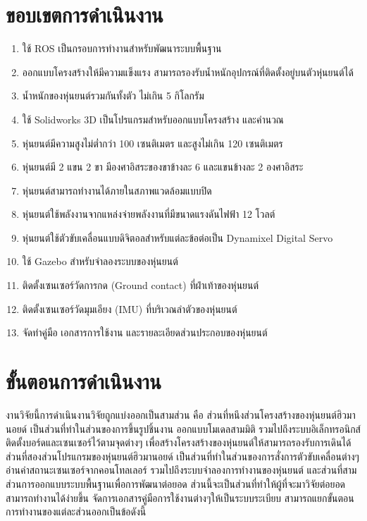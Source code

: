 \section{ขอบเขตการดำเนินงาน}
\begin{enumerate}[label=\thesection.\arabic*, leftmargin=1.5cm]
	\item ใช้ ROS เป็นกรอบการทำงานสำหรับพัฒนาระบบพื้นฐาน
	\item ออกแบบโครงสร้างให้มีความแข็งแรง สามารถรองรับน้ำหนักอุปกรณ์ที่ติดตั้งอยู่บนตัวหุ่นยนต์ได้
	\item น้ำหนักของหุ่นยนต์รวมกันทั้งตัว ไม่เกิน 5 กิโลกรัม
	\item ใช้ Solidworks 3D เป็นโปรแกรมสำหรับออกแบบโครงสร้าง และคำนวณ
	\item หุ่นยนต์มีความสูงไม่ต่ำกว่า 100 เซนติเมตร และสูงไม่เกิน 120 เซนติเมตร
	\item หุ่นยนต์มี 2 แขน 2 ขา มีองศาอิสระของขาข้างละ 6 และแขนข้างละ 2 องศาอิสระ
	\item หุ่นยนต์สามารถทำงานได้ภายในสภาพแวดล้อมแบบปิด
	\item หุ่นยนต์ใช้พลังงานจากแหล่งจ่ายพลังงานที่มีขนาดแรงดันไฟฟ้า 12 โวลต์
	\item หุ่นยนต์ใช้ตัวขับเคลื่อนแบบดิจิตอลสำหรับแต่ละข้อต่อเป็น Dynamixel Digital Servo
	\item ใช้ Gazebo สำหรับจำลองระบบของหุ่นยนต์
	\item ติดตั้งเซนเซอร์วัดการกด (Ground contact) ที่ฝ่าเท้าของหุ่นยนต์
	\item ติดตั้งเซนเซอร์วัดมุมเอียง (IMU) ที่บริเวณลำตัวของหุ่นยนต์
	\item จัดทำคู่มือ เอกสารการใช้งาน และรายละเอียดส่วนประกอบของหุ่นยนต์
\end{enumerate}

\section{ขั้นตอนการดำเนินงาน}
งานวิจัยนี้การดำเนินงานวิจัยถูกแบ่งออกเป็นสามส่วน คือ ส่วนที่หนึงส่วนโครงสร้างของหุ่นยนต์ฮิวมานอยด์ เป็นส่วนที่ทำในส่วนของการขึ้นรูปชิ้นงาน
ออกแบบโมเดลสามมิติ รวมไปถึงระบบอิเล็กทรอนิกส์ ติดตั้งบอร์ดและเซนเซอร์ไว้ตามจุดต่างๆ เพื่อสร้างโครงสร้างของหุ่นยนต์ให้สามารถรองรับการเดินได้
ส่วนที่สองส่วนโปรแกรมของหุ่นยนต์ฮิวมานอยด์ เป็นส่วนที่ทำในส่วนของการสั่งการตัวขับเคลื่อนต่างๆ อ่านค่าสถานะเซนเซอร์จากคอนโทลเลอร์
รวมไปถึงระบบจำลองการทำงานของหุ่นยนต์ และส่วนที่สามส่วนการออกแบบระบบพื้นฐานเพื่อการพัฒนาต่อยอด ส่วนนี้จะเป็นส่วนที่ทำให้ผู้ที่จะมาวิจัยต่อยอดสามารถทำงานได้ง่ายขึ้น
จัดการเอกสารคู่มือการใช้งานต่างๆให้เป็นระบบระเบียบ สามารถแยกขั้นตอนการทำงานของแต่ละส่วนออกเป็นข้อดังนี้

